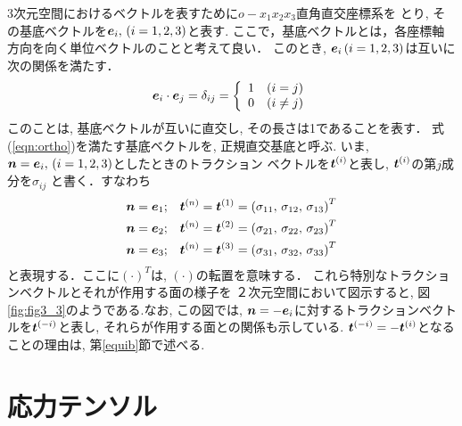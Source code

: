 \documentclass[10pt,a4j]{jbook}
\begin{document}
3次元空間におけるベクトルを表すために$o-x_1x_2x_3$直角直交座標系を
とり, その基底ベクトルを$\mbox{\boldmath $e$}_i,\, (i=1,2,3)$と表す.
ここで，基底ベクトルとは，各座標軸方向を向く単位ベクトルのことと考えて良い．
このとき, $\mbox{\boldmath $e$}_i\, (i=1,2,3)$は互いに次の関係を満たす．
\begin{equation}
	\mbox{\boldmath $e$}_i\cdot \mbox{\boldmath $e$}_j=
	\delta_{ij}=
	\left\{
	\begin{array}{cc}
		1 & (i=j) \\
		0 & (i \neq j) \\
	\end{array}
	\right.
	\label{eqn:ortho}
\end{equation}
このことは, 基底ベクトルが互いに直交し, その長さは1であることを表す．
式(\ref{eqn:ortho})を満たす基底ベクトルを, 正規直交基底と呼ぶ.
いま, $\mbox{\boldmath $n$}=\mbox{\boldmath $e$}_i,\, (i=1,2,3)$としたときのトラクション
ベクトルを$\mbox{\boldmath $t$}^{(i)}$と表し, $\mbox{\boldmath $t$}^{(i)}$の第$j$成分を$\sigma_{ij}$
と書く．すなわち
\begin{eqnarray}
	\mbox{\boldmath $n$}=\mbox{\boldmath $e$}_1 &;& \mbox{\boldmath $t$}^{(n)}=\mbox{\boldmath $t$}^{(1)}
		=\left( \sigma_{11},\, \sigma_{12},\, \sigma_{13}\right)^T \\
	\mbox{\boldmath $n$}=\mbox{\boldmath $e$}_2 &;& \mbox{\boldmath $t$}^{(n)}=\mbox{\boldmath $t$}^{(2)} 
		=\left( \sigma_{21},\, \sigma_{22},\, \sigma_{23}\right)^T \\
	\mbox{\boldmath $n$}=\mbox{\boldmath $e$}_3 &;& \mbox{\boldmath $t$}^{(n)}=\mbox{\boldmath $t$}^{(3)} 
		=\left( \sigma_{31},\, \sigma_{32},\, \sigma_{33}\right)^T 
\end{eqnarray}
と表現する．ここに$(\cdot)^T$は, $(\cdot)$の転置を意味する．
これら特別なトラクションベクトルとそれが作用する面の様子を
２次元空間において図示すると, 図\ref{fig:fig3_3}のようである.なお, この図では, 
$\mbox{\boldmath $n$}=-\mbox{\boldmath $e$}_i$に対するトラクションベクトルを$\mbox{\boldmath $t$}^{(-i)}$と表し, 
それらが作用する面との関係も示している.
$\mbox{\boldmath $t$}^{(-i)}=-\mbox{\boldmath $t$}^{(i)}$となることの理由は, 第\ref{equib}節で述べる.
\section{応力テンソル}
\end{document}

